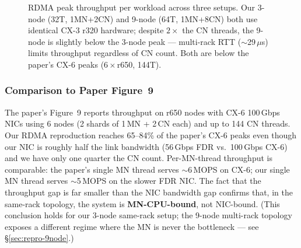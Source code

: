 \documentclass[conference]{IEEEtran}
\begin{document}
\begin{figure}[H]
\centering
{}%
\caption{RDMA peak throughput per workload across three setups. Our 3-node (32T, 1MN+2CN) and 9-node (64T, 1MN+8CN) both use identical CX-3 r320 hardware; despite $2\times$ the CN threads, the 9-node is slightly below the 3-node peak --- multi-rack RTT ($\sim$29\,$\mu$s) limits throughput regardless of CN count. Both are below the paper's CX-6 peaks ($6\times$r650, 144T).}
\label{fig:rdma-ycsb-peaks}
\end{figure}

\subsubsection{Comparison to Paper Figure~9}

The paper's Figure~9 reports throughput on r650 nodes with CX-6 100\,Gbps NICs using 6 nodes (2 shards of 1\,MN + 2\,CN each) and up to 144 CN threads. Our RDMA reproduction reaches 65--84\% of the paper's CX-6 peaks even though our NIC is roughly half the link bandwidth (56\,Gbps FDR vs.\ 100\,Gbps CX-6) and we have only one quarter the CN count. Per-MN-thread throughput is comparable: the paper's single MN thread serves $\sim$6\,MOPS on CX-6; our single MN thread serves $\sim$5\,MOPS on the slower FDR NIC. The fact that the throughput gap is far smaller than the NIC bandwidth gap confirms that, in the same-rack topology, the system is \textbf{MN-CPU-bound}, not NIC-bound. (This conclusion holds for our 3-node same-rack setup; the 9-node multi-rack topology exposes a different regime where the MN is never the bottleneck --- see \S\ref{sec:repro-9node}.)
\end{document}
